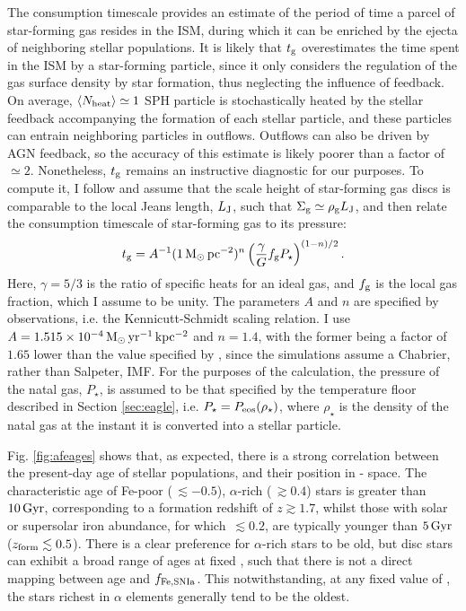 The consumption timescale provides an estimate of the period of time a parcel of star-forming gas resides in the ISM, during which it can be enriched by the ejecta of neighboring stellar populations. It is likely that $t_{\rm g}$ overestimates the time spent in the ISM by a star-forming particle, since it only considers the regulation of the gas surface density by star formation, thus neglecting the influence of feedback. On average, $\langle N_{\rm heat} \rangle \simeq 1$ SPH particle is stochastically heated by the stellar feedback accompanying the formation of each stellar particle, and these particles can entrain neighboring particles in outflows. Outflows can also be driven by AGN feedback, so the accuracy of this estimate is likely poorer than a factor of $\simeq 2$. Nonetheless, $t_{\rm g}$ remains an instructive diagnostic for our purposes. To compute it, I follow \citet{2008MNRAS.383.1210S} and assume that the scale height of star-forming gas discs is comparable to the local Jeans length, $L_{\rm J}$, such that $\Sigma_{\rm g} \simeq \rho_{\rm g}L_{\rm J}$, and then relate the consumption timescale of star-forming gas to its pressure:
\begin{equation}
\label{eq:t_g}
 t_{\rm g} = A^{-1}(1\,{\rm M}_\odot\,{\rm pc}^{-2})^n\left( \frac{\gamma}{G} f_{\rm g}P_\star\right)^{(1-n)/2}.
\end{equation}
Here, $\gamma=5/3$ is the ratio of specific heats for an ideal gas, and $f_{\rm g}$ is the local gas fraction, which I assume to be unity. The parameters $A$ and $n$ are specified by observations, i.e. the Kennicutt-Schmidt scaling relation. I use $A=1.515\times 10^{-4}\,{\rm M}_\odot\,{\rm yr}^{-1}\,{\rm kpc^{-2}}$ and $n=1.4$, with the former being a factor of $1.65$ lower than the value specified by \citet{1998ApJ...498..541K}, since the simulations assume a Chabrier, rather than Salpeter, IMF. For the purposes of the calculation, the pressure of the natal gas, $P_\star$, is assumed to be that specified by the temperature floor described in Section \ref{sec:eagle}, i.e. $P_\star = P_{\rm eos}(\rho_\star)$, where $\rho_\star$ is the density of the natal gas at the instant it is converted into a stellar particle.

Fig. \ref{fig:afeages} shows that, as expected, there is a strong correlation between the present-day age of stellar populations, and their position in \afe{}-\feh{} space. The characteristic age of Fe-poor (\feh{}$\,\lesssim -0.5$), $\alpha$-rich (\afe{}$\,\gtrsim 0.4$) stars is greater than $10\,{\rm Gyr}$, corresponding to a formation redshift of $z \gtrsim 1.7$, whilst those with solar or supersolar iron abundance, for which \afe{}$\,\lesssim 0.2$, are typically younger than $5\,{\rm Gyr}$ ($z_{\rm form} \lesssim 0.5$). There is a clear preference for $\alpha$-rich stars to be old, but disc stars can exhibit a broad range of ages at fixed \afe{}, such that there is not a direct mapping between age and $f_{\rm Fe,SNIa}$. This notwithstanding, at any fixed value of \feh{}, the stars richest in $\alpha$ elements generally tend to be the oldest. 

